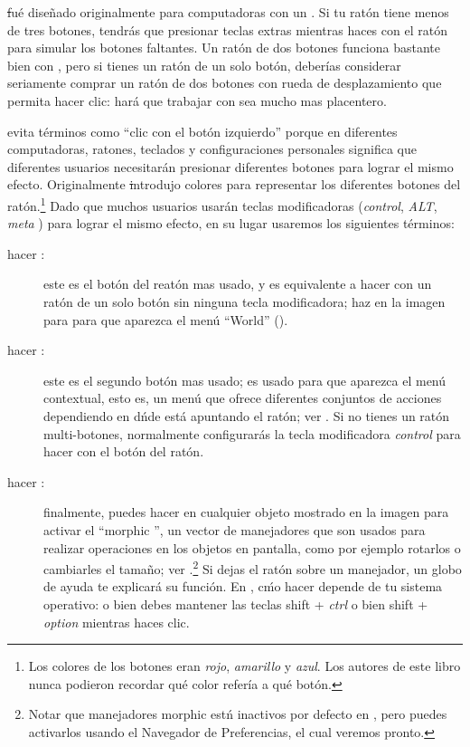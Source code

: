 \documentclass[a4paper,10pt,twoside]{book}
\begin{document}
\st fu\'e diseñado originalmente para computadoras con un . Si tu rat\'on tiene menos de tres botones, tendr\'as que presionar teclas extras mientras haces \click con el rat\'on para simular los botones faltantes. Un rat\'on de dos botones funciona bastante bien con \pharo, pero si tienes un rat\'on de un solo bot\'on, deber\'ias considerar seriamente comprar un rat\'on de dos botones con rueda de desplazamiento que permita hacer clic: har\'a que trabajar con \pharo sea mucho mas placentero.

\pharo evita t\'erminos como ``clic con el bot\'on izquierdo'' porque en diferentes computadoras, ratones, teclados y configuraciones personales significa que diferentes usuarios necesitar\'an presionar diferentes botones para lograr el mismo efecto.
Originalmente \st introdujo colores para representar los diferentes botones del rat\'on.\footnote{Los colores de los botones eran \emph{rojo}, \emph{amarillo} y \emph{azul}. Los autores de este libro nunca podieron recordar qu\'e color refer\'ia a qu\'e bot\'on.}
Dado que muchos usuarios usar\'an teclas modificadoras (\emph{control}, \emph{ALT}, \emph{meta} \etc) para lograr el mismo efecto, en su lugar usaremos los siguientes t\'erminos:
\begin{description}
\item [hacer \click:] este es el bot\'on del reat\'on mas usado, y es equivalente a hacer \click con un rat\'on de un solo bot\'on sin ninguna tecla modificadora; haz \click en la imagen para para que aparezca el men\'u ``World'' ().
\item [hacer \actclick:] este es el segundo bot\'on mas usado; es usado para que aparezca el men\'u contextual, esto es, un men\'u que ofrece diferentes conjuntos de acciones dependiendo en d\'nde est\'a apuntando el rat\'on; ver . Si no tienes un rat\'on multi-botones, normalmente configurar\'as la tecla modificadora \emph{control} para hacer \actclick con el bot\'on del rat\'on.
\item [hacer \metaclick:] finalmente, puedes hacer \metaclick en cualquier objeto mostrado en la imagen para activar el ``morphic '', un vector de manejadores que son usados para realizar operaciones en los objetos en pantalla, como por ejemplo rotarlos o cambiarles el tamaño; ver .\footnote{Notar que manejadores morphic est\'n inactivos por defecto en \pharo, pero puedes activarlos usando el Navegador de Preferencias, el cual veremos pronto.}
Si dejas el rat\'on sobre un manejador, un globo de ayuda te explicar\'a su funci\'on.
En \pharo, c\'mo hacer \metaclick depende de tu sistema operativo:
o bien debes mantener las teclas {\sc shift} + \emph{ctrl} o bien {\sc shift} + \emph{option} mientras haces clic.
\end{description}
\end{document}
